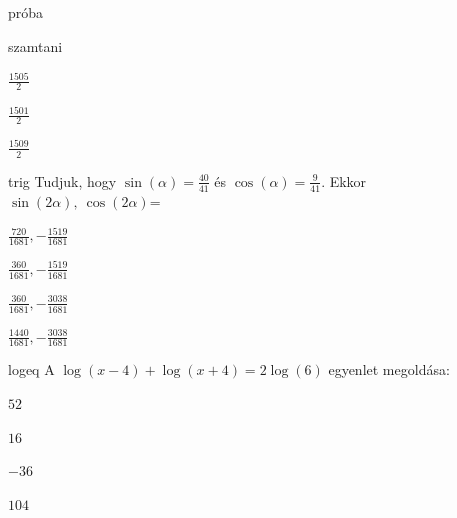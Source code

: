 \documentclass[12pt]{article}
\begin{document}
\begin{quiz}{próba}
\begin{multi}{szamtani}
\item  $\frac{1505}{2}$
\item  $\frac{1501}{2}$
\item  $\frac{1509}{2}$
\end{multi}
\begin{multi}{trig}
Tudjuk, hogy $ \sin(\alpha) =\frac{40}{41}$ és $ \cos(\alpha) = \frac{9}{41} $. 
Ekkor $ \sin(2\alpha),\ \cos(2\alpha) $=
\item* $ \frac{720}{1681}, -\frac{1519}{1681} $
\item  $ \frac{360}{1681}, -\frac{1519}{1681} $
\item  $ \frac{360}{1681}, -\frac{3038}{1681} $
\item  $ \frac{1440}{1681}, -\frac{3038}{1681} $
\end{multi}
\begin{multi}{logeq}
A $ \log(x-4)+\log(x+4)=2\log(6) $ egyenlet megoldása:
\item* $ 52  $
\item  $ 16 $
\item  $ -36 $
\item  $ 104 $
\end{multi}
\end{quiz}
\end{document}
